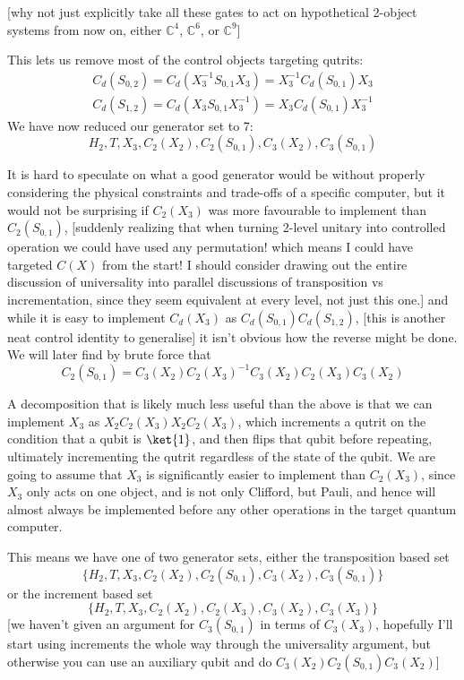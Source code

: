 [why not just explicitly take all these gates to act on hypothetical 2-object systems from now on, either $\mathbb{C}^4$, $\mathbb{C}^6$, or $\mathbb{C}^9$]

This lets us remove most of the control objects targeting qutrits:
\begin{align*}
	C_d(S_{0, 2}) = C_d(X_3^{-1}S_{0,1}X_3) = X_3^{-1}C_d(S_{0,1})X_3
	\\
	C_d(S_{1, 2}) = C_d(X_3S_{0,1}X_3^{-1}) = X_3C_d(S_{0,1})X_3^{-1}
\end{align*}
We have now reduced our generator set to 7:
\[H_2, T, X_3, C_2(X_2), C_2(S_{0, 1}), C_3(X_2), C_3(S_{0, 1})\]

It is hard to speculate on what a good generator would be without properly considering the physical constraints and trade-offs of a specific computer, but it would not be surprising if $C_2(X_3)$ was more favourable to implement than $C_2(S_{0, 1})$, [suddenly realizing that when turning 2-level unitary into controlled operation we could have used any permutation! which means I could have targeted $C(X)$ from the start! I should consider drawing out the entire discussion of universality into parallel discussions of transposition vs incrementation, since they seem equivalent at every level, not just this one.] and while it is easy to implement $C_d(X_3)$ as $C_d(S_{0,1})C_d(S_{1,2})$, [this is another neat control identity to generalise] it isn't obvious how the reverse might be done. We will later find by brute force that
\[C_2(S_{0,1}) = C_3(X_2) C_2(X_3)^{-1} C_3(X_2) C_2(X_3) C_3(X_2)\]

A decomposition that is likely much less useful than the above is that we can implement $X_3$ as $X_2C_2(X_3)X_2C_2(X_3)$, which increments a qutrit on the condition that a qubit is $\ket{1}$, and then flips that qubit before repeating, ultimately incrementing the qutrit regardless of the state of the qubit. We are going to assume that $X_3$ is significantly easier to implement than $C_2(X_3)$, since $X_3$ only acts on one object, and is not only Clifford, but Pauli, and hence will almost always be implemented before any other operations in the target quantum computer.

This means we have one of two generator sets, either the transposition based set
\[\{H_2, T, X_3, C_2(X_2), C_2(S_{0, 1}), C_3(X_2), C_3(S_{0, 1})\}\]
or the increment based set
\[\{H_2, T, X_3, C_2(X_2), C_2(X_3), C_3(X_2), C_3(X_3)\}\]
[we haven't given an argument for $C_3(S_{0,1})$ in terms of $C_3(X_3)$, hopefully I'll start using increments the whole way through the universality argument, but otherwise you can use an auxiliary qubit and do $C_3(X_2)C_2(S_{0,1})C_3(X_2)$]

